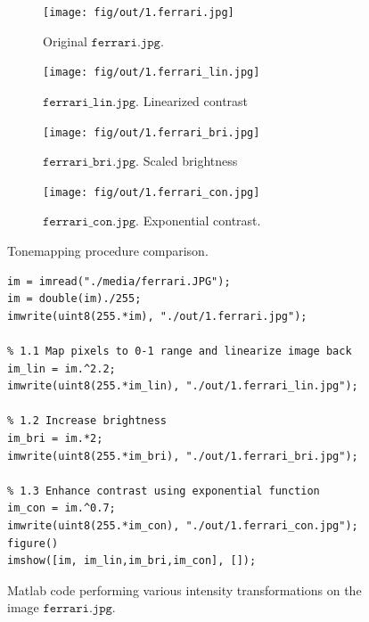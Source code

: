 \documentclass[tikz,14pt,fleqn]{article}
\begin{document}
\begin{figure}[h!]
    \begin{subfigure}{0.5\textwidth}
        \centering
        \texttt{[image: fig/out/1.ferrari.jpg]}
        \caption{Original $\texttt{ferrari.jpg}$.}
    \end{subfigure}
    \begin{subfigure}{0.5\textwidth}
        \centering
        \texttt{[image: fig/out/1.ferrari\_lin.jpg]}
        \caption{$\texttt{ferrari\_lin.jpg}$. Linearized contrast}
    \end{subfigure}

    \begin{subfigure}{0.5\textwidth}
        \centering
        \texttt{[image: fig/out/1.ferrari\_bri.jpg]}
        \caption{$\texttt{ferrari\_bri.jpg}$. Scaled brightness}
    \end{subfigure}
    \begin{subfigure}{0.5\textwidth}
        \centering
        \texttt{[image: fig/out/1.ferrari\_con.jpg]}
        \caption{$\texttt {ferrari\_con.jpg}$. Exponential contrast.}
    \end{subfigure}

    \caption{Tonemapping procedure comparison.}
\end{figure}

\begin{figure}[h!]
    \begin{verbatim} 
im = imread("./media/ferrari.JPG");
im = double(im)./255;
imwrite(uint8(255.*im), "./out/1.ferrari.jpg");

% 1.1 Map pixels to 0-1 range and linearize image back
im_lin = im.^2.2;
imwrite(uint8(255.*im_lin), "./out/1.ferrari_lin.jpg");

% 1.2 Increase brightness
im_bri = im.*2;
imwrite(uint8(255.*im_bri), "./out/1.ferrari_bri.jpg");

% 1.3 Enhance contrast using exponential function
im_con = im.^0.7;
imwrite(uint8(255.*im_con), "./out/1.ferrari_con.jpg");
figure()
imshow([im, im_lin,im_bri,im_con], []);
        \end{verbatim}
\caption{Matlab code performing various intensity transformations on the image $\texttt{ferrari.jpg}$.}
\end{figure}
\end{document}
